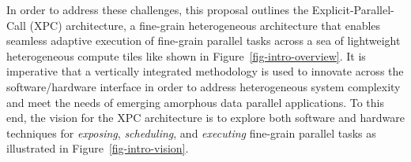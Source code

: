 In order to address these challenges, this proposal outlines the
Explicit-Parallel-Call (XPC) architecture, a fine-grain heterogeneous
architecture that enables seamless adaptive execution of fine-grain
parallel tasks across a sea of lightweight heterogeneous compute tiles
like shown in Figure~\ref{fig-intro-overview}. It is imperative that a
vertically integrated methodology is used to innovate across the
software/hardware interface in order to address heterogeneous system
complexity and meet the needs of emerging amorphous data parallel
applications. To this end, the vision for the XPC architecture is to
explore both software and hardware techniques for \emph{exposing},
\emph{scheduling}, and \emph{executing} fine-grain parallel tasks as
illustrated in Figure~\ref{fig-intro-vision}.
